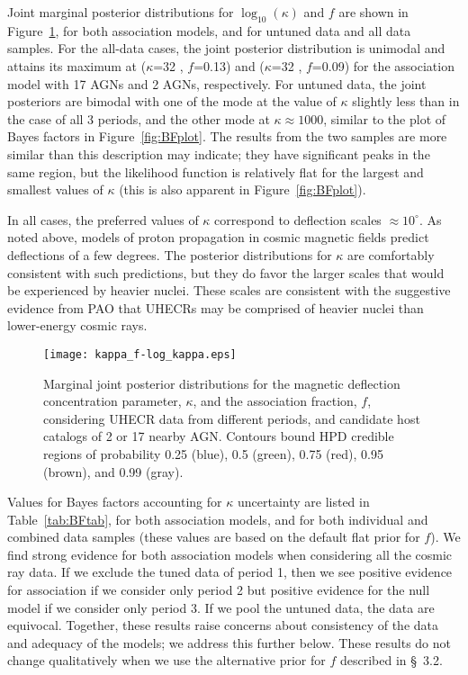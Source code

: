 Joint marginal posterior distributions for $\log_{10}(\kappa)$ and $f$ are
shown in Figure~\ref{fig:jointkappaf}, for both association models, and for
untuned data and all data samples.  For the all-data cases, the joint
posterior distribution is unimodal and attains its maximum at ($\kappa$=32 ,
$f$=0.13) and ($\kappa$=32 , $f$=0.09) for the association model with 17
AGNs and 2 AGNs, respectively.  For untuned data, the joint posteriors are
bimodal with one of the mode at the value of $\kappa$ slightly less than in
the case of all 3 periods, and the other mode at $\kappa\approx 1000$,
similar to the plot of Bayes factors in Figure~\ref{fig:BFplot}.  The
results from the two samples are more similar than this description may
indicate; they have significant peaks in the same region, but the likelihood
function is relatively flat for the largest and smallest values of $\kappa$
(this is also apparent in Figure~\ref{fig:BFplot}).

In all cases, the preferred values of $\kappa$ correspond to deflection
scales $\approx 10^\circ$.  As noted above, models of proton propagation in
cosmic magnetic fields predict deflections of a few degrees.
The posterior distributions for $\kappa$ are comfortably consistent with
such predictions, but they do favor the larger scales that would be
experienced by heavier nuclei.  These scales are consistent with the
suggestive evidence from PAO that UHECRs may be comprised of heavier nuclei
than lower-energy cosmic rays.

\begin{figure}
\centerline{\texttt{[image: kappa\_f-log\_kappa.eps]}}
\caption{Marginal joint posterior distributions for the magnetic deflection
concentration parameter, $\kappa$, and the association fraction, $f$,
considering UHECR data from different periods, and candidate host catalogs of 2
or 17 nearby AGN.  Contours bound HPD credible regions of probability
0.25 (blue), 0.5 (green), 0.75 (red), 0.95 (brown), and 0.99 (gray).}
\label{fig:jointkappaf}
\end{figure}

Values for Bayes factors accounting for $\kappa$ uncertainty are listed in
Table~\ref{tab:BFtab}, for both association models, and for both individual
and combined data samples (these values are based on the default flat
prior for $f$).  We find strong evidence for both association models when
considering all the cosmic ray data.  If we exclude the tuned data of period
1, then we see positive evidence for association if we consider only period
2 but positive evidence for the null model if we consider only period 3.  If
we pool the untuned data, the data are equivocal.  Together, these results
raise concerns about consistency of the data and adequacy of the models; we
address this further below.  These results do not change qualitatively when
we use the alternative prior for $f$ described in \S~3.2.

